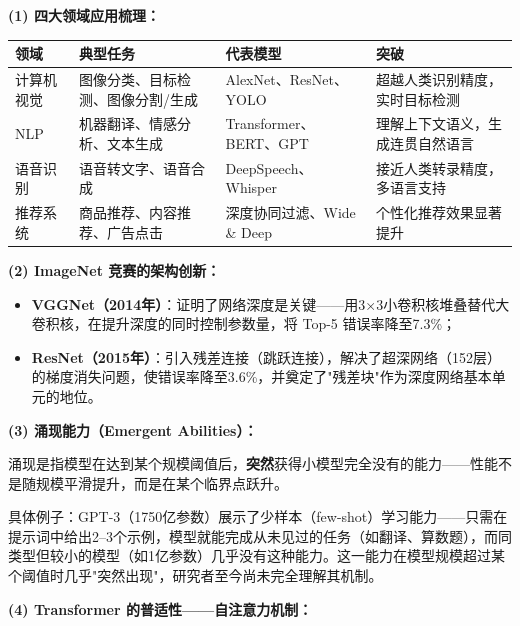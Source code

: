 \documentclass[a4paper,11pt]{ctexart}
\begin{document}
\begin{solutionbox}[参考答案与详细解析]
    \textbf{(1) 四大领域应用梳理：}

    \begin{center}
    \begin{tabular}{p{2.5cm} p{3.2cm} p{2.8cm} p{2.8cm}}
        \toprule
        领域 & 典型任务 & 代表模型 & 突破 \\
        \midrule
        计算机视觉 & 图像分类、目标检测、图像分割/生成 & AlexNet、ResNet、YOLO & 超越人类识别精度，实时目标检测 \\[0.8em]
        NLP & 机器翻译、情感分析、文本生成 & Transformer、BERT、GPT & 理解上下文语义，生成连贯自然语言 \\[0.8em]
        语音识别 & 语音转文字、语音合成 & DeepSpeech、Whisper & 接近人类转录精度，多语言支持 \\[0.8em]
        推荐系统 & 商品推荐、内容推荐、广告点击 & 深度协同过滤、Wide \& Deep & 个性化推荐效果显著提升 \\
        \bottomrule
    \end{tabular}
    \end{center}

    \textbf{(2) ImageNet 竞赛的架构创新：}

    \begin{itemize}
        \item \textbf{VGGNet（2014年）}：证明了网络深度是关键——用3×3小卷积核堆叠替代大卷积核，在提升深度的同时控制参数量，将 Top-5 错误率降至7.3\%；
        \item \textbf{ResNet（2015年）}：引入残差连接（跳跃连接），解决了超深网络（152层）的梯度消失问题，使错误率降至3.6\%，并奠定了"残差块"作为深度网络基本单元的地位。
    \end{itemize}

    \textbf{(3) 涌现能力（Emergent Abilities）：}

    涌现是指模型在达到某个规模阈值后，\textbf{突然}获得小模型完全没有的能力——性能不是随规模平滑提升，而是在某个临界点跃升。

    具体例子：GPT-3（1750亿参数）展示了少样本（few-shot）学习能力——只需在提示词中给出2--3个示例，模型就能完成从未见过的任务（如翻译、算数题），而同类型但较小的模型（如1亿参数）几乎没有这种能力。这一能力在模型规模超过某个阈值时几乎"突然出现"，研究者至今尚未完全理解其机制。

    \textbf{(4) Transformer 的普适性——自注意力机制：}


\end{solutionbox}
\end{document}
